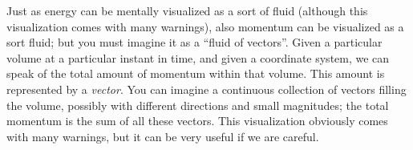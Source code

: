 \documentclass[a4paper,12pt,%
onecolumn,oneside,%
british%
]{memoir}
\renewcommand*{\|}[1][]{\nonscript\:#1\vert\nonscript\:\mathopen{}}
\begin{document}
Just as energy can be mentally visualized as a sort of fluid (although this visualization comes with many warnings), also momentum can be visualized as a sort fluid; but you must imagine it as a \enquote{fluid of vectors}.
%
%
Given a particular volume at a particular instant in time, and given a coordinate system, we can speak of the total amount of momentum within that volume. This amount is represented by a \emph{vector}. You can imagine a continuous collection of vectors filling the volume, possibly with different directions and small magnitudes; the total momentum is the sum of all these vectors. This visualization obviously comes with many warnings, but it can be very useful if we are careful.
\end{document}
